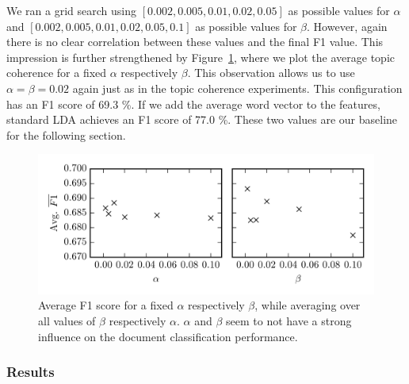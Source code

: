 \documentclass[
        a4paper,
        titlepage,
        twoside,
        parskip,
        numbers=noenddot
        ]{scrbook}
\theoremstyle{break}
\begin{document}
We ran a grid search using $[0.002, 0.005, 0.01, 0.02, 0.05]$ as possible values for $\alpha$ and $[0.002, 0.005, 0.01, 0.02, 0.05, 0.1]$ as possible values for $\beta$.
However, again there is no clear correlation between these values and the final F1 value.
This impression is further strengthened by Figure~\ref{fig:standard_lda_alpha_beta_dc}, where we plot the average topic coherence for a fixed $\alpha$ respectively $\beta$.
This observation allows us to use $\alpha = \beta = 0.02$ again just as in the topic coherence experiments.
This configuration has an F1 score of 69.3 \%.
If we add the average word vector to the features, standard LDA achieves an F1 score of 77.0 \%.
These two values are our baseline for the following section.
\begin{figure}
       \centering
       \includegraphics[width=12cm]{figures/standard_lda_alpha_beta_dc.png}
       \caption{Average F1 score for a fixed $\alpha$ respectively $\beta$, while averaging over all values of $\beta$ respectively $\alpha$. $\alpha$ and $\beta$ seem to not have a strong influence on the document classification performance.}
       \label{fig:standard_lda_alpha_beta_dc}
\end{figure}

\subsubsection{Results}
\end{document}
